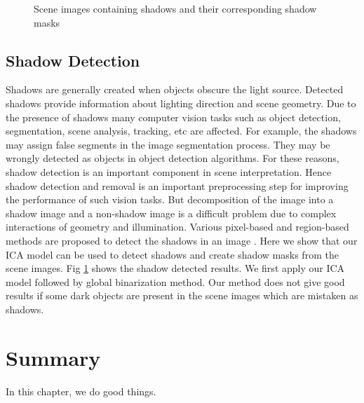 \begin{figure}[t]
{}
\caption
{Scene images containing shadows and their corresponding shadow masks}
\label{fig:shadow}
\end{figure}

\subsection{Shadow Detection}
Shadows are generally created when objects obscure the light source. 
Detected shadows provide information about
lighting direction and scene geometry.
Due to the presence of shadows many computer vision 
tasks such as object detection, segmentation, scene analysis, tracking, etc are affected.
For example, the shadows may assign false segments in the 
image segmentation process. They may be wrongly detected as objects in 
object detection algorithms.
For these reasons,
shadow detection is an important component in scene interpretation.
Hence 
shadow detection and removal is an important preprocessing step for improving the performance of such vision tasks.
But decomposition of the image into a shadow image and a non-shadow image
is a difficult problem due to 
complex interactions of geometry and illumination.
Various pixel-based and region-based methods are
proposed to detect the shadows in an image \cite{chap4-8, chap4-9, chap4-10, chap4-11}.
Here we show that our ICA model can be used to detect shadows and create shadow masks from the scene images.
Fig \ref{fig:shadow} shows the shadow detected results. We first apply our ICA model followed by
global binarization method. Our method does not give good results if some dark objects are present in the scene
images which are mistaken as shadows.

\section{Summary}
In this chapter, we do good things.
